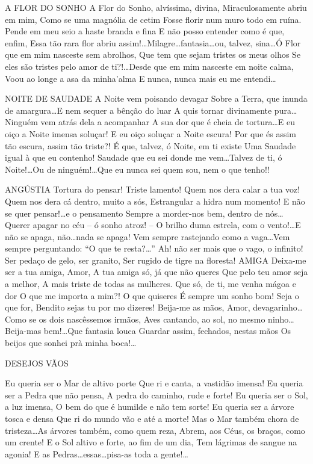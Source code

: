 A FLOR DO SONHO A Flor do Sonho, alvíssima, divina, Miraculosamente abriu em mim, Como se uma magnólia de cetim Fosse florir num muro todo em ruína. Pende em meu seio a haste branda e fina E não posso entender como é que, enfim,  Essa tão rara flor abriu assim!\ldots Milagre\ldots fantasia\ldots ou, talvez, sina\ldots Ó Flor que em mim nasceste sem abrolhos, Que tem que sejam tristes os meus olhos Se eles são tristes pelo amor de ti?!\ldots Desde que em mim nasceste em noite calma, Voou ao longe a asa da minha’alma E nunca, nunca mais eu me entendi\ldots 

NOITE DE SAUDADE A Noite vem poisando devagar Sobre a Terra, que inunda de amargura\ldots E nem sequer a bênção do luar A quis tornar divinamente pura\ldots Ninguém vem atrás dela a acompanhar A sua dor que é cheia de tortura\ldots E eu oiço a Noite imensa soluçar! E eu oiço soluçar a Noite escura! Por que és assim tão escura, assim tão triste?! É que, talvez, ó Noite, em ti existe Uma Saudade igual à que eu contenho! Saudade que eu sei donde me vem\ldots Talvez de ti, ó Noite!\ldots Ou de ninguém!\ldots Que eu nunca sei quem sou, nem o que tenho!! 


ANGÚSTIA Tortura do pensar! Triste lamento! Quem nos dera calar a tua voz! Quem nos dera cá dentro, muito a sós,  Estrangular a hidra num momento! E não se quer pensar!\ldots e o pensamento Sempre a morder-nos bem, dentro de nós\ldots Querer apagar no céu – ó sonho atroz! –  O brilho duma estrela, com o vento!\ldots E não se apaga, não\ldots nada se apaga! Vem sempre rastejando como a vaga\ldots Vem sempre perguntando: “O que te resta?\ldots   ” Ah! não ser mais que o vago, o infinito! Ser pedaço de gelo, ser granito, Ser rugido de tigre na floresta! AMIGA Deixa-me ser a tua amiga, Amor, A tua amiga só, já que não queres Que pelo teu amor seja a melhor, A mais triste de todas as mulheres. Que só, de ti, me venha mágoa e dor O que me importa a mim?! O que quiseres É sempre um sonho bom! Seja o que for, Bendito sejas tu por mo dizeres! Beija-me as mãos, Amor, devagarinho\ldots Como se os dois nascêssemos irmãos, Aves cantando, ao sol, no mesmo ninho\ldots Beija-mas bem!\ldots Que fantasia louca Guardar assim, fechados, nestas mãos Os beijos que sonhei prà minha boca!\ldots 

DESEJOS VÃOS 

Eu queria ser o Mar de altivo porte Que ri e canta, a vastidão imensa! Eu queria ser a Pedra que não pensa, A pedra do caminho, rude e forte! Eu queria ser o Sol, a luz imensa,  O bem do que é humilde e não tem sorte! Eu queria ser a árvore tosca e densa Que ri do mundo vão e até a morte! Mas o Mar também chora de tristeza\ldots As árvores também, como quem reza,  Abrem, aos Céus, os braços, como um crente! E o Sol altivo e forte, ao fim de um dia, Tem lágrimas de sangue na agonia! E as Pedras\ldots essas\ldots pisa-as toda a gente!\ldots 

